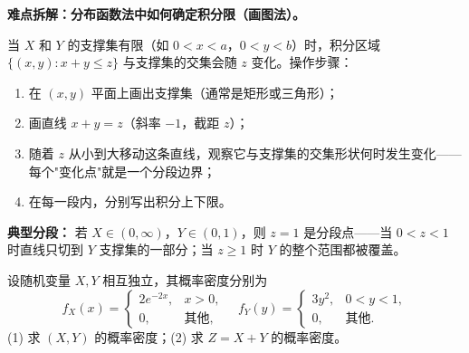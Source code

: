 ﻿\documentclass[lang=cn,11pt]{elegantbook}
\begin{document}
\begin{note}
\textbf{难点拆解：分布函数法中如何确定积分限（画图法）。}

当 $X$ 和 $Y$ 的支撑集有限（如 $0<x<a$，$0<y<b$）时，积分区域 $\{(x,y): x+y\leqslant z\}$ 与支撑集的交集会随 $z$ 变化。操作步骤：
\begin{enumerate}
    \item 在 $(x,y)$ 平面上画出支撑集（通常是矩形或三角形）；
    \item 画直线 $x+y=z$（斜率 $-1$，截距 $z$）；
    \item 随着 $z$ 从小到大移动这条直线，观察它与支撑集的交集形状何时发生变化——每个"变化点"就是一个分段边界；
    \item 在每一段内，分别写出积分上下限。
\end{enumerate}
\textbf{典型分段：} 若 $X\in(0,\infty)$，$Y\in(0,1)$，则 $z=1$ 是分段点——当 $0<z<1$ 时直线只切到 $Y$ 支撑集的一部分；当 $z\geqslant 1$ 时 $Y$ 的整个范围都被覆盖。
\end{note}

\begin{exercise}[卷积公式分段积分] \label{exer:3-8b}
设随机变量 $X, Y$ 相互独立，其概率密度分别为
\[
f_X(x) = \begin{cases} 2e^{-2x}, & x > 0, \\ 0, & \text{其他}, \end{cases} \quad f_Y(y) = \begin{cases} 3y^2, & 0 < y < 1, \\ 0, & \text{其他}. \end{cases}
\]
(1) 求 $(X,Y)$ 的概率密度；(2) 求 $Z = X + Y$ 的概率密度。
\end{exercise}
\end{document}
